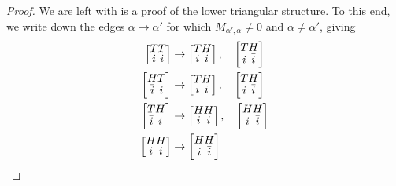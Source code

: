 \documentclass[11pt]{article}
\begin{document}
\begin{proof}
We are left with is a proof of the lower triangular structure. 
To this end, we write down the edges $\alpha\to\alpha'$ for which $M_{\alpha',\alpha}\neq 0$ and $\alpha\neq\alpha'$, giving
\begin{align}
\renewcommand{\arraystretch}{0.7}
\left[
\begin{array}{@{}c@{}c@{}c@{}c@{}}   T&T \\ i&i \end{array}\right]
  &\to
\left[
\begin{array}{@{}c@{}c@{}c@{}c@{}}  T&H \\ i&i \end{array}\right],\quad
\left[
\begin{array}{@{}c@{}c@{}c@{}c@{}} T&H \\ i&\bar i \end{array}\right]
     \\
\left[
\begin{array}{@{}c@{}c@{}c@{}c@{}}  H&T \\ \bar i& i \end{array}\right]
  &\to
\left[
\begin{array}{@{}c@{}c@{}c@{}c@{}} T&H \\ i&i \end{array}\right],\quad
\left[
\begin{array}{@{}c@{}c@{}c@{}c@{}}  T&H \\ i&\bar i \end{array}\right]  
  \\
\left[
\begin{array}{@{}c@{}c@{}c@{}c@{}} T&H \\ \bar i& i \end{array}\right]
  &\to
\left[
\begin{array}{@{}c@{}c@{}c@{}c@{}} H&H \\ i&i \end{array}\right],\quad
\left[
\begin{array}{@{}c@{}c@{}c@{}c@{}} H&H \\ i&\bar i \end{array}\right]  
  \\
\left[
\begin{array}{@{}c@{}c@{}c@{}c@{}}  H&H \\ i& i \end{array}\right]
  &\to
\left[
\begin{array}{@{}c@{}c@{}c@{}c@{}}  H&H \\ i&\bar i \end{array}\right]  

\end{align}
\end{proof}
\end{document}
